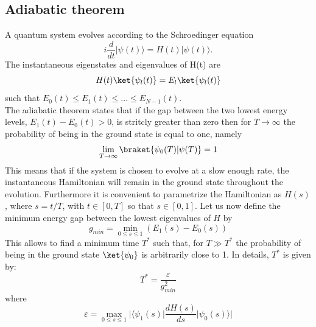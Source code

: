     \subsection{Adiabatic theorem}\label{subsec:adiabatic theorem}
    A quantum system evolves according to the Schroedinger equation
    \begin{equation}
        i\frac{d}{dt}|\psi(t)\rangle = H(t)|\psi(t)\rangle.
    \end{equation}
    The instantaneous eigenstates and eigenvalues of H(t) are
    \begin{equation}
        H(t)\ket{\psi_l(t)} = E_l\ket{\psi_l(t)}
    \end{equation}
    such that $E_0(t) \leq E_1(t) \leq ... \leq E_{N-1}(t)$. \\
    The adiabatic theorem states that if the gap between the two lowest energy levels, $E_{1}(t) - E_{0}(t) > 0$, is stritcly greater than zero then for $T\rightarrow \infty$ the probability of being in the ground state is equal to one, namely
    \begin{equation}
        \lim_{T \to \infty} \braket{\psi_0(T)|\psi(T)}= 1
    \end{equation}
    This means that if the system is chosen to evolve at a slow enough rate, the instantaneous Hamiltonian will remain in the ground state throughout the evolution. Furthermore it is convenient to parametrize the Hamiltonian as $H(s)$, where $s=t/T$, with $t \in [0,T]$ so that $s \in [0,1]$.
    Let us now define the minimum energy gap between the lowest eigenvalues of $H$ by
    \begin{equation}
        g_{min} = \min_{0 \leq s \leq 1} (E_1(s)-E_0(s))
    \end{equation}
    This allows to find a minimum time $T^*$ such that, for $T\gg T^*$ the probability of being in the ground state $\ket{\psi_0}$ is arbitrarily close to 1. In details, $T^*$ is given by:
    \begin{equation}
        T^* = \frac{\varepsilon}{g^{2}_{min}}
        \label{eq:adiabatic_time}
    \end{equation}
    where
    \begin{equation}
        \varepsilon = \max_{0 \leq s \leq 1} \Big| \Big\langle \psi_1(s)\Big| \frac{dH(s)}{ds} \Big| \psi_0(s)\Big\rangle\Big|
    \end{equation}\\


